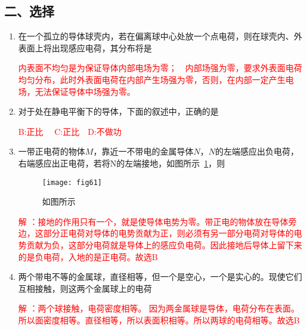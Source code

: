 \subsection*{二、选择}
\begin{enumerate}
    \item  在一个孤立的导体球壳内，若在偏离球中心处放一个点电荷，则在球壳内、外表面上将出现感应电荷，其分布将是~
    \begin{note}
        \textcolor{red}{内表面不均匀是为保证导体内部电场为零；\ \ 内部场强为零，要求外表面电荷均匀分布，此时外表面电荷在内部产生场强为零，否则，在内部一定产生电场，无法保证导体中场强为零。
        }
    \end{note}
    \item 对于处在静电平衡下的导体，下面的叙述中，正确的是~
    \begin{note}
        \textcolor{red}{B:正比 \ \ C:正比\ \ D:不做功}
    \end{note}
    \item 一带正电荷的物体$M$，靠近一不带电的金属导体$N$，$N$的左端感应出负电荷，右端感应出正电荷，若将N的左端接地，如图所示~\ref{Fig:61}，则~
    \begin{figure}[H]
        \centering
        \texttt{[image: fig61]}
        \caption{如图所示}\label{Fig:61}
    \end{figure}
    \begin{note}
        \textcolor{red}{解 ：接地的作用只有一个，就是使导体电势为零。带正电的物体放在导体旁边，这部分正电荷对导体的电势贡献为正，则必须有另一部分电荷对导体的电势贡献为负，这部分电荷就是导体上的感应负电荷。因此接地后导体上留下来的是负电荷，入地的是正电荷。故选B
        }
    \end{note}
    \item 两个带电不等的金属球，直径相等，但一个是空心，一个是实心的。现使它们互相接触，则这两个金属球上的电荷~
    \begin{note}
        \textcolor{red}{解 ：两个球接触，电荷密度相等。
        因为两金属球是导体，电荷分布在表面。所以面密度相等。直径相等，所以表面积相等。所以两球的电荷相等。故选B
}
\end{note}
\end{enumerate}
